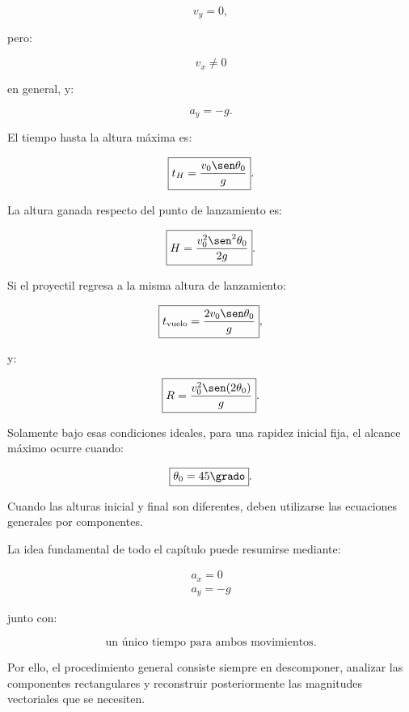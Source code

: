 \begin{resumen}
\[
\boxed{
v_y=0
},
\]

pero:

\[
\boxed{
v_x\neq0
}
\]

en general, y:

\[
\boxed{
a_y=-g
}.
\]

El tiempo hasta la altura máxima es:

\[
\boxed{
t_H
=
\frac{v_0\sen\theta_0}{g}
}.
\]

La altura ganada respecto del punto de lanzamiento es:

\[
\boxed{
H
=
\frac{
v_0^2\sen^2\theta_0
}{
2g
}
}.
\]

Si el proyectil regresa a la misma altura de lanzamiento:

\[
\boxed{
t_{\mathrm{vuelo}}
=
\frac{
2v_0\sen\theta_0
}{
g
}
},
\]

y:

\[
\boxed{
R
=
\frac{
v_0^2\sen(2\theta_0)
}{
g
}
}.
\]

Solamente bajo esas condiciones ideales, para una rapidez inicial fija, el
alcance máximo ocurre cuando:

\[
\boxed{
\theta_0=45\grado
}.
\]

Cuando las alturas inicial y final son diferentes, deben utilizarse las
ecuaciones generales por componentes.

La idea fundamental de todo el capítulo puede resumirse mediante:

\[
\boxed{
\begin{array}{c}
a_x=0
\\[2mm]
a_y=-g
\end{array}
}
\]

junto con:

\[
\boxed{
\text{un único tiempo para ambos movimientos}
}.
\]

Por ello, el procedimiento general consiste siempre en descomponer, analizar las
componentes rectangulares y reconstruir posteriormente las magnitudes vectoriales
que se necesiten.
\end{resumen}